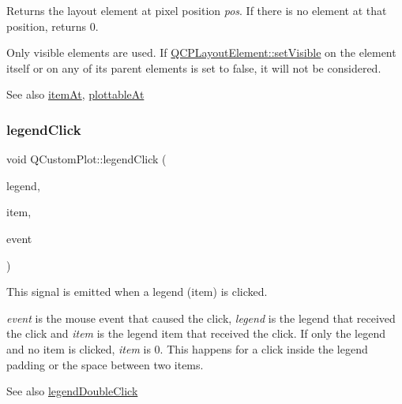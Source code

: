 Returns the layout element at pixel position {\itshape pos}. If there is no element at that position, returns 0.

Only visible elements are used. If \hyperlink{class_q_c_p_layerable_a3bed99ddc396b48ce3ebfdc0418744f8}{Q\+C\+P\+Layout\+Element\+::set\+Visible} on the element itself or on any of its parent elements is set to false, it will not be considered.

\begin{DoxySeeAlso}{See also}
\hyperlink{class_q_custom_plot_ac08578e0e6c059c83a8d340ba0038e8e}{item\+At}, \hyperlink{class_q_custom_plot_acddbbd8b16dd633f0d94e5a736fbd8cf}{plottable\+At} 
\end{DoxySeeAlso}
\hypertarget{class_q_custom_plot_a79cff0baafbca10a3aaf694d2d3b9ab3}{}\label{class_q_custom_plot_a79cff0baafbca10a3aaf694d2d3b9ab3} 
\subsubsection{\texorpdfstring{legend\+Click}{legendClick}}
{\footnotesize\ttfamily void Q\+Custom\+Plot\+::legend\+Click (\begin{DoxyParamCaption}\item[{\hyperlink{class_q_c_p_legend}{Q\+C\+P\+Legend} $\ast$}]{legend,  }\item[{\hyperlink{class_q_c_p_abstract_legend_item}{Q\+C\+P\+Abstract\+Legend\+Item} $\ast$}]{item,  }\item[{Q\+Mouse\+Event $\ast$}]{event }\end{DoxyParamCaption})\hspace{0.3cm}{\ttfamily [signal]}}

This signal is emitted when a legend (item) is clicked.

{\itshape event} is the mouse event that caused the click, {\itshape legend} is the legend that received the click and {\itshape item} is the legend item that received the click. If only the legend and no item is clicked, {\itshape item} is 0. This happens for a click inside the legend padding or the space between two items.

\begin{DoxySeeAlso}{See also}
\hyperlink{class_q_custom_plot_a0250f835c044521df1619b132288bca7}{legend\+Double\+Click} 
\end{DoxySeeAlso}
\hypertarget{class_q_custom_plot_a0250f835c044521df1619b132288bca7}{}\label{class_q_custom_plot_a0250f835c044521df1619b132288bca7} 
